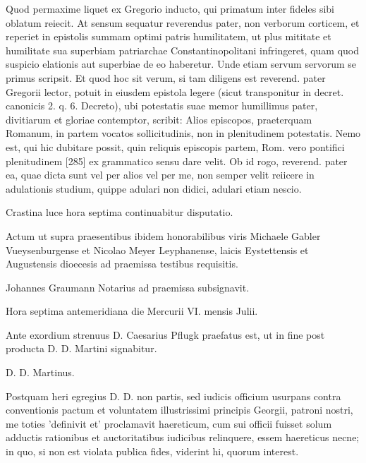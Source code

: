 Quod permaxime liquet ex Gregorio inducto, qui primatum inter fideles sibi oblatum reiecit. At sensum sequatur reverendus pater, non verborum corticem, et reperiet in epistolis summam optimi patris humilitatem, ut plus mititate et humilitate sua superbiam patriarchae Constantinopolitani infringeret, quam quod suspicio elationis aut superbiae de eo haberetur. Unde etiam servum servorum se primus scripsit. Et quod hoc sit verum, si tam diligens est reverend. pater Gregorii lector, potuit in eiusdem epistola legere (sicut transponitur in decret. canonicis 2. q. 6. Decreto), ubi potestatis suae memor humillimus pater, divitiarum et gloriae contemptor, scribit: Alios episcopos, praeterquam Romanum, in partem vocatos sollicitudinis, non in plenitudinem potestatis. Nemo est, qui hic dubitare possit, quin reliquis episcopis partem, Rom. vero pontifici plenitudinem [285] ex grammatico sensu dare velit. Ob id rogo, reverend. pater ea, quae dicta sunt vel per alios vel per me, non semper velit reiicere in adulationis studium, quippe adulari non didici, adulari etiam nescio.

Crastina luce hora septima continuabitur disputatio.

Actum ut supra praesentibus ibidem honorabilibus viris Michaele Gabler Vueysenburgense et Nicolao Meyer Leyphanense, laicis Eystettensis et Augustensis dioecesis ad praemissa testibus requisitis.

Johannes Graumann Notarius ad praemissa subsignavit.

Hora septima antemeridiana die Mercurii VI. mensis Julii.

Ante exordium strenuus D. Caesarius Pflugk praefatus est, ut in fine post producta D. D. Martini signabitur.

D. D. Martinus.

Postquam heri egregius D. D. non partis, sed iudicis officium usurpans contra conventionis pactum et voluntatem illustrissimi principis Georgii, patroni nostri, me toties 'definivit et' proclamavit haereticum, cum sui officii fuisset solum adductis rationibus et auctoritatibus iudicibus relinquere, essem haereticus necne; in quo, si non est violata publica fides, viderint hi, quorum interest.

